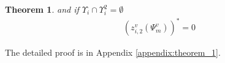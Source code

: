 \documentclass[10pt,journal, compsoc]{IEEEtran}
\newtheorem{theorem}{Theorem}
\begin{document}
\begin{theorem}
and if $\Upsilon_i \cap \Upsilon_i^2 = \emptyset$
\begin{equation}\label{eqn:asp_case2_optimal_solution_individual_rationality}
\begin{aligned}
    (z_{i,2}^{v}(\Psi_m^v))^*=0
\end{aligned}
\end{equation}

\end{theorem}
The detailed proof is in Appendix \ref{appendix:theorem_1}.
\end{document}
